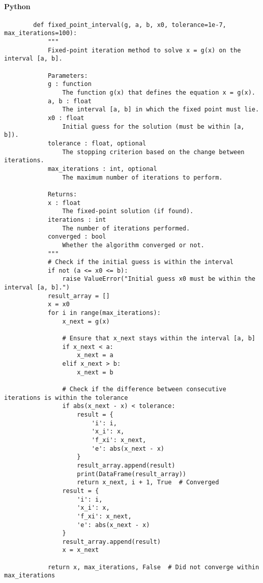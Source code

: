 \documentclass{article}
\begin{document}
    \paragraph{Python}
    \begin{verbatim}
        def fixed_point_interval(g, a, b, x0, tolerance=1e-7, max_iterations=100):
            """
            Fixed-point iteration method to solve x = g(x) on the interval [a, b].

            Parameters:
            g : function
                The function g(x) that defines the equation x = g(x).
            a, b : float
                The interval [a, b] in which the fixed point must lie.
            x0 : float
                Initial guess for the solution (must be within [a, b]).
            tolerance : float, optional
                The stopping criterion based on the change between iterations.
            max_iterations : int, optional
                The maximum number of iterations to perform.

            Returns:
            x : float
                The fixed-point solution (if found).
            iterations : int
                The number of iterations performed.
            converged : bool
                Whether the algorithm converged or not.
            """
            # Check if the initial guess is within the interval
            if not (a <= x0 <= b):
                raise ValueError("Initial guess x0 must be within the interval [a, b].")
            result_array = []
            x = x0
            for i in range(max_iterations):
                x_next = g(x)

                # Ensure that x_next stays within the interval [a, b]
                if x_next < a:
                    x_next = a
                elif x_next > b:
                    x_next = b

                # Check if the difference between consecutive iterations is within the tolerance
                if abs(x_next - x) < tolerance:
                    result = {
                        'i': i,
                        'x_i': x,
                        'f_xi': x_next,
                        'e': abs(x_next - x)
                    }
                    result_array.append(result)
                    print(DataFrame(result_array))
                    return x_next, i + 1, True  # Converged
                result = {
                    'i': i,
                    'x_i': x,
                    'f_xi': x_next,
                    'e': abs(x_next - x)
                }
                result_array.append(result)
                x = x_next

            return x, max_iterations, False  # Did not converge within max_iterations
    \end{verbatim}
\end{document}
